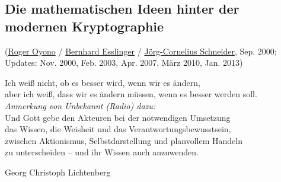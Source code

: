 \begin{refsegment}
\chapter[Die mathematischen Ideen hinter der modernen Kryptographie]
        {Die mathematischen Ideen hinter der modernen Kryptographie\footnotemark}
\label{Chapter_ModernCryptography}
(\hyperlink{author_Roger-Oyono}{Roger Oyono} /
 \hyperlink{author_Bernhard-Esslinger}{Bernhard Esslinger} /
 \hyperlink{author_Joerg-Cornelius-Schneider}{Jörg-Cornelius Schneider},
 Sep. 2000;
 Updates: Nov. 2000, Feb. 2003, Apr. 2007, März 2010, Jan. 2013)

\begin{ctsquote}
   Ich weiß nicht, ob es besser wird, wenn wir es ändern,\\
   aber ich weiß, dass wir es ändern müssen, wenn es besser werden soll.\\
   {\em Anmerkung von Unbekannt (Radio) dazu:}\\
   Und Gott gebe den Akteuren bei der notwendigen Umsetzung\\
   das Wissen, die Weisheit und das Verantwortungsbewusstsein,\\
   zwischen Aktionismus, Selbstdarstellung und planvollem Handeln\\
   zu unterscheiden -- und ihr Wissen auch anzuwenden.
\caption[Georg Christoph Lichtenberg]{Georg Christoph Lichtenberg\footnotemark}
\end{ctsquote}


\end{refsegment}
